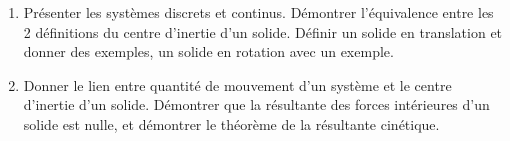 \documentclass[a4paper, 12pt, final, garamond]{book}
\begin{document}
\begin{enumerate}
  \item Présenter les systèmes discrets et continus. Démontrer l'équivalence
    entre les 2 définitions du centre d'inertie d'un solide. Définir un solide
    en translation et donner des exemples, un solide en rotation avec un
    exemple.
  \item Donner le lien entre quantité de mouvement d'un système et le centre
      d'inertie d'un solide. Démontrer que la résultante des forces
      intérieures d'un solide est nulle, et démontrer le théorème de la
      résultante cinétique.
\end{enumerate}
\end{document}
